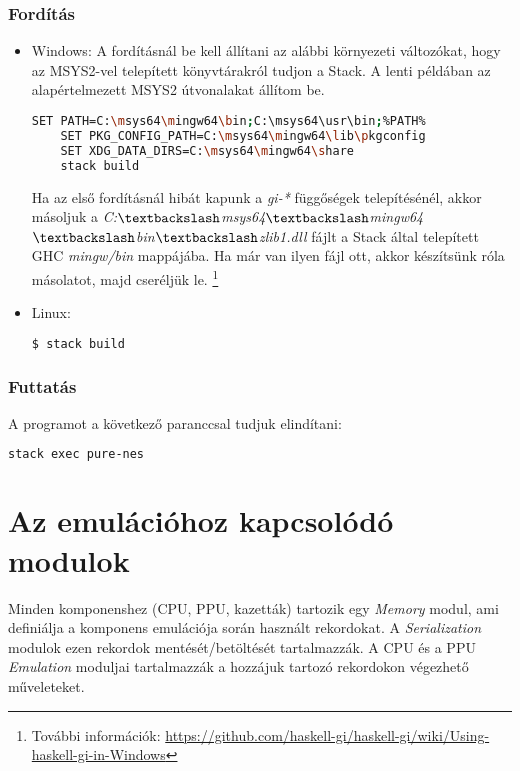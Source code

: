 \subsubsection{Fordítás}
\begin{itemize}
	\item Windows: A fordításnál be kell állítani az alábbi környezeti változókat, hogy 
	az MSYS2-vel telepített könyvtárakról tudjon a Stack. A lenti példában az alapértelmezett MSYS2 útvonalakat állítom be.
	\begin{lstlisting}[language=bash]
	SET PATH=C:\msys64\mingw64\bin;C:\msys64\usr\bin;%PATH%
	SET PKG_CONFIG_PATH=C:\msys64\mingw64\lib\pkgconfig
	SET XDG_DATA_DIRS=C:\msys64\mingw64\share
	stack build
	\end{lstlisting}
	Ha az első fordításnál hibát kapunk a \emph{gi-*} függőségek telepítésénél, akkor másoljuk a 
	\emph{C:$\textbackslash$msys64$\textbackslash$mingw64$\textbackslash$bin$\textbackslash$zlib1.dll} fájlt a Stack által telepített GHC \emph{mingw/bin} mappájába. Ha már van ilyen fájl ott, akkor készítsünk róla másolatot, majd cseréljük le.
	\footnote{További információk: \href{https://github.com/haskell-gi/haskell-gi/wiki/Using-haskell-gi-in-Windows}{https://github.com/haskell-gi/haskell-gi/wiki/Using-haskell-gi-in-Windows}}

	\item Linux:
	\begin{lstlisting}[language=bash]
	$ stack build
	\end{lstlisting}
\end{itemize}

\subsubsection{Futtatás}
A programot a következő paranccsal tudjuk elindítani:
\begin{lstlisting}[language=bash]
stack exec pure-nes
\end{lstlisting}

\section{Az emulációhoz kapcsolódó modulok}

Minden komponenshez (CPU, PPU, kazetták) tartozik egy \emph{Memory} modul, ami definiálja a komponens emulációja során használt rekordokat. A \emph{Serialization} modulok ezen rekordok mentését/betöltését tartalmazzák. A CPU és a PPU \emph{Emulation} moduljai tartalmazzák a hozzájuk tartozó rekordokon végezhető műveleteket.

